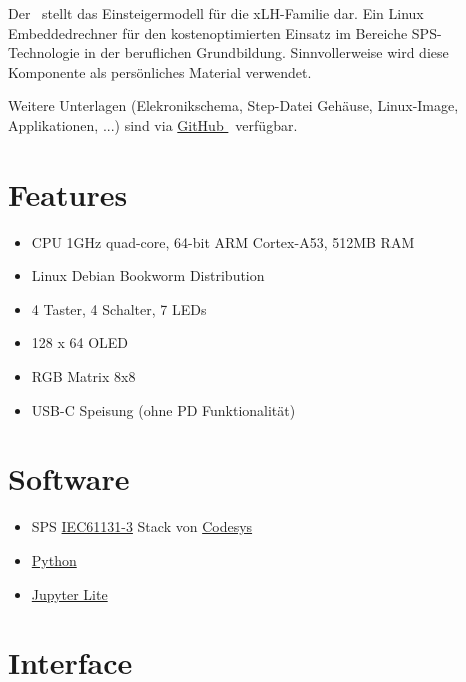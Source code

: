 

Der \textbf{\lernplattformname}\ stellt das Einsteigermodell für die xLH-Familie dar.
Ein Linux Embeddedrechner für den kostenoptimierten Einsatz im Bereiche SPS-Technologie in der beruflichen Grundbildung.
Sinnvollerweise wird diese Komponente als persönliches Material verwendet.

Weitere Unterlagen (Elekronikschema, Step-Datei Gehäuse, Linux-Image, Applikationen, ...) sind via
\href{https://github.com/xemax-ag/xLH/}{GitHub \lernplattformname}\ verfügbar.

\section{Features}

\begin{itemize}
    \item CPU 1GHz quad-core, 64-bit ARM Cortex-A53, 512MB RAM
    \item Linux Debian Bookworm Distribution
    \item 4 Taster, 4 Schalter, 7 LEDs
    \item 128 x 64 OLED
    \item RGB Matrix 8x8
    \item USB-C Speisung (ohne PD Funktionalität)
\end{itemize}

\section{Software}

\begin{itemize}
    \item SPS \href{https://de.wikipedia.org/wiki/EN_61131}{IEC61131-3} Stack von \href{https://www.codesys.com/}{Codesys}
    \item \href{https://www.python.org/}{Python}
    \item \href{https://jupyter.org/try-jupyter/lab/}{Jupyter Lite}
\end{itemize}

\section{Interface}

